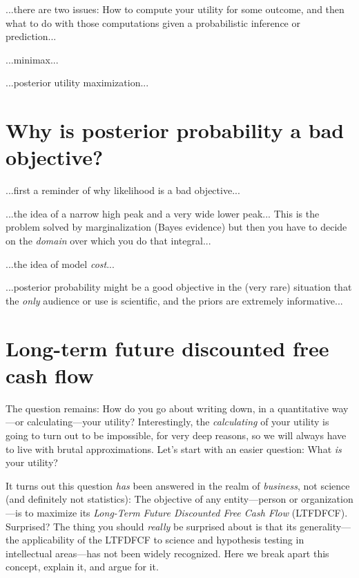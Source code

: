 \documentclass[12pt,twoside,pdftex]{article}
\begin{document}

...there are two issues: How to compute your utility for some outcome,
and then what to do with those computations given a probabilistic
inference or prediction...

...minimax...

...posterior utility maximization...

\section{Why is posterior probability a bad objective?}

...first a reminder of why likelihood is a bad objective...

...the idea of a narrow high peak and a very wide lower peak...  This
is the problem solved by marginalization (Bayes evidence) but then you
have to decide on the \emph{domain} over which you do that integral...

...the idea of model \emph{cost}...

...posterior probability might be a good objective in the (very rare)
situation that the \emph{only} audience or use is scientific, and the
priors are extremely informative...

\section{Long-term future discounted free cash flow}

The question remains: How do you go about writing down, in a
quantitative way---or calculating---your utility?  Interestingly, the
\emph{calculating} of your utility is going to turn out to be
impossible, for very deep reasons, so we will always have to live with
brutal approximations.  Let's start with an easier question: What
\emph{is} your utility?

It turns out this question \emph{has} been
answered in the realm of \emph{business},
not science (and definitely not statistics):
The objective of any entity---person or organization---is to maximize
its \emph{Long-Term Future Discounted Free Cash Flow} (LTFDFCF).
Surprised?  The thing you should \emph{really} be surprised about is
that its generality---the applicability of the LTFDFCF to science and
hypothesis testing in intellectual areas---has not been widely
recognized.  Here we break apart this concept, explain it, and argue
for it.
\end{document}
